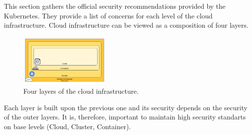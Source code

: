 This section gathers the official security recommendations provided by the Kubernetes. They provide a list of concerns for each level of the cloud infrastructure. Cloud infrastructure can be viewed as a composition of four layers.

\begin{figure}[!hbt]
	\begin{center}
		\includegraphics[width=0.4\textwidth]{images/cloud-security.png}
        \caption{Four layers of the cloud infrastructure.}
		\label{img:cloud-security}
	\end{center}
\end{figure}

Each layer is built upon the previous one and its security depends on the security of the outer layers. It is, therefore, important to maintain high security standarts on base levels (Cloud, Cluster, Container).

